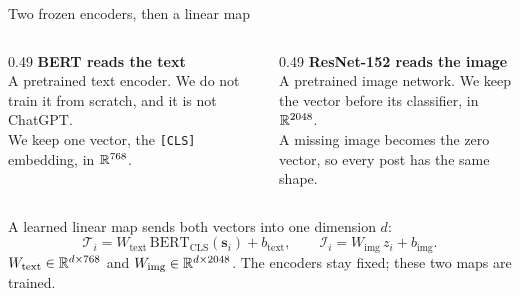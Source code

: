\begin{frame}{Two frozen encoders, then a linear map}
  \begin{columns}[T,onlytextwidth]
    \begin{column}{0.49\textwidth}
      \textbf{BERT reads the text}\\[0.35em]
      A pretrained text encoder. We do not train it from scratch, and it is not ChatGPT.\\[0.45em]
      We keep one vector, the \texttt{[CLS]} embedding, in $\mathbb{R}^{768}$.
    \end{column}
    \begin{column}{0.49\textwidth}
      \textbf{ResNet-152 reads the image}\\[0.35em]
      A pretrained image network. We keep the vector before its classifier, in $\mathbb{R}^{2048}$.\\[0.45em]
      A missing image becomes the zero vector, so every post has the same shape.
    \end{column}
  \end{columns}
  \vspace{0.75em}
  A learned linear map sends both vectors into one dimension $d$:
  \[
    \mathcal{T}_i = W_{\mathrm{text}}\,\mathrm{BERT}_{\mathrm{CLS}}(\mathbf{s}_i)+b_{\mathrm{text}},
    \qquad
    \mathcal{I}_i = W_{\mathrm{img}}\,z_i+b_{\mathrm{img}}.
  \]
  {\small $W_{\mathrm{text}}\in\mathbb{R}^{d\times 768}$ and $W_{\mathrm{img}}\in\mathbb{R}^{d\times 2048}$. The encoders stay fixed; these two maps are trained.}
\end{frame}

